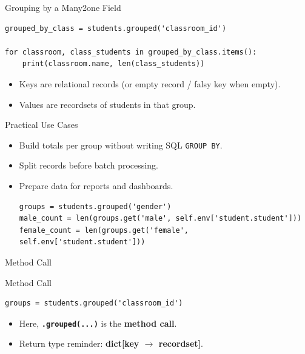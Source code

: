 \begin{frame}[fragile]{Grouping by a Many2one Field}
\begin{lstlisting}
grouped_by_class = students.grouped('classroom_id')

for classroom, class_students in grouped_by_class.items():
	print(classroom.name, len(class_students))
\end{lstlisting}
	\begin{itemize}
		\item Keys are relational records (or empty record / falsy key when empty).
		\item Values are recordsets of students in that group.
	\end{itemize}
\end{frame}

\begin{frame}[fragile]{Practical Use Cases}
	\begin{itemize}
		\item Build totals per group without writing SQL \texttt{GROUP BY}.
		\item Split records before batch processing.
		\item Prepare data for reports and dashboards.
\begin{lstlisting}
groups = students.grouped('gender')
male_count = len(groups.get('male', self.env['student.student']))
female_count = len(groups.get('female', self.env['student.student']))
\end{lstlisting}
	\end{itemize}
\end{frame}

\begin{frame}[fragile]{Method Call}
\begin{block}{Method Call}
\begin{lstlisting}
groups = students.grouped('classroom_id')
\end{lstlisting}
	\begin{itemize}
		\item Here, \textbf{\texttt{.grouped(...)}} is the \textbf{method call}.
		\item Return type reminder: \textbf{dict[key $\rightarrow$ recordset]}.
	\end{itemize}
\end{block}
\end{frame}
